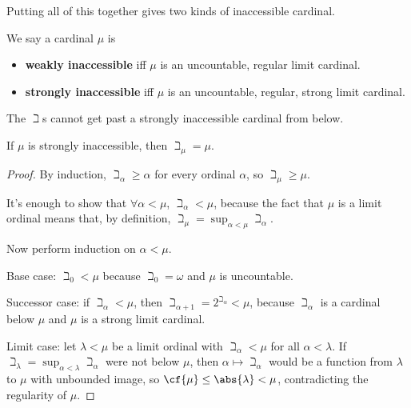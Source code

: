 Putting all of this together gives two kinds of inaccessible cardinal.

\begin{boxdefinition}
    We say a cardinal $\mu$ is
    \begin{itemize}
        \item \textbf{weakly inaccessible} iff $\mu$ is an uncountable, regular limit cardinal.
        \item \textbf{strongly inaccessible} iff $\mu$ is an uncountable, regular, strong limit cardinal.
    \end{itemize}
\end{boxdefinition}

The $\beth$s cannot get past a strongly inaccessible cardinal from below.

\begin{boxproposition}
    If $\mu$ is strongly inaccessible, then $\beth_{\mu} = \mu$.
\end{boxproposition}
\begin{proof}
    By induction, $\beth_{\alpha} \geq \alpha$ for every ordinal $\alpha$, so $\beth_{\mu} \geq \mu$.

    It's enough to show that $\forall \alpha < \mu$, $\beth_{\alpha} < \mu$, because the fact that $\mu$ is a limit ordinal means that, by definition, $\beth_{\mu} = \sup_{\alpha < \mu} \beth_{\alpha}$.

    Now perform induction on $\alpha < \mu$.
    
    Base case: $\beth_0 < \mu$ because $\beth_0 = \omega$ and $\mu$ is uncountable.

    Successor case: if $\beth_{\alpha} < \mu$, then $\beth_{\alpha + 1} = 2^{\beth_{\alpha}} < \mu$, because $\beth_{\alpha}$ is a cardinal below $\mu$ and $\mu$ is a strong limit cardinal.

    Limit case: let $\lambda < \mu$ be a limit ordinal with $\beth_{\alpha} < \mu$ for all $\alpha < \lambda$. If $\beth_{\lambda} = \sup_{\alpha < \lambda} \beth_{\alpha}$ were not below $\mu$, then $\alpha \mapsto \beth_{\alpha}$ would be a function from $\lambda$ to $\mu$ with unbounded image, so $\cf{\mu} \leq \abs{\lambda} < \mu$, contradicting the regularity of $\mu$.
\end{proof}
